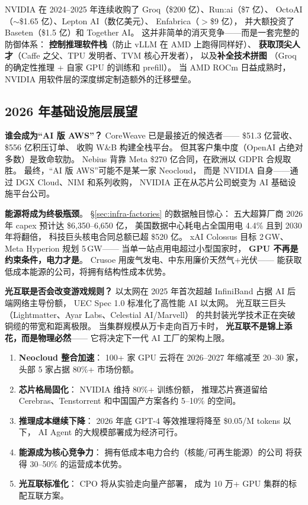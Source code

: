 \begin{keybox}
NVIDIA 在 2024--2025 年连续收购了
Groq（\$200 亿）、Run:ai（\$7 亿）、
OctoAI（$\sim$\$1.65 亿）、Lepton AI（数亿美元）、
Enfabrica（$>$\$9 亿），
并大额投资了 Baseten（\$1.5 亿）和 Together AI。
这并非简单的消灭竞争——而是一套完整的防御体系：
\textbf{控制推理软件栈}（防止 vLLM 在 AMD 上跑得同样好）、
\textbf{获取顶尖人才}（Caffe 之父、TPU 发明者、TVM 核心开发者），
以及\textbf{补全技术拼图}
（Groq 的确定性推理 + 自家 GPU 的训练和 prefill）。
当 AMD ROCm 日益成熟时，
NVIDIA 用软件层的深度绑定制造额外的迁移壁垒。
\end{keybox}

\subsection{2026 年基础设施层展望}

\textbf{谁会成为``AI 版 AWS''？}
CoreWeave 已是最接近的候选者——
\$51.3 亿营收、\$556 亿积压订单、
收购 W\&B 构建全栈平台。
但其客户集中度（OpenAI 占绝对多数）是致命软肋。
Nebius 背靠 Meta \$270 亿合同，在欧洲以 GDPR 合规取胜。
最终，``AI 版 AWS''可能不是某一家 Neocloud，
而是 NVIDIA 自身——通过 DGX Cloud、NIM 和系列收购，
NVIDIA 正在从芯片公司蜕变为 AI 基础设施平台公司。

\textbf{能源将成为终极瓶颈}。
\S\ref{sec:infra-factories} 的数据触目惊心：
五大超算厂商 2026 年 capex 预计达 \$6,350--6,650 亿，
美国数据中心耗电占全国用电 4.4\% 且到 2030 年将翻倍，
科技巨头核电合同总额已超 \$520 亿。
xAI Colossus 目标 2\,GW、Meta Hyperion 规划 5\,GW——
当单一站点用电超过小型国家时，
\textbf{GPU 不再是约束条件，电力才是}。
Crusoe 用废气发电、中东用廉价天然气+光伏——
能获取低成本能源的公司，将拥有结构性成本优势。

\textbf{光互联是否会改变游戏规则？}
以太网在 2025 年首次超越 InfiniBand 占据 AI 后端网络主导份额，
UEC Spec 1.0 标准化了高性能 AI 以太网。
光互联三巨头（Lightmatter、Ayar Labs、Celestial AI/Marvell）
的共封装光学技术正在突破铜缆的带宽和距离极限。
当集群规模从万卡走向百万卡时，
\textbf{光互联不是锦上添花，而是物理必然}——
它将决定下一代 AI 工厂的架构上限。

\begin{corebox}
\begin{enumerate}[noitemsep]
  \item \textbf{Neocloud 整合加速}：
        100+ 家 GPU 云将在 2026--2027 年缩减至 20--30 家，
        头部 5 家占据 80\%+ 市场份额。
  \item \textbf{芯片格局固化}：
        NVIDIA 维持 80\%+ 训练份额，
        推理芯片赛道留给 Cerebras、Tenstorrent
        和中国国产方案各约 5--10\% 的空间。
  \item \textbf{推理成本继续下降}：
        2026 年底 GPT-4 等效推理将降至 \$0.05/M tokens 以下，
        AI Agent 的大规模部署成为经济可行。
  \item \textbf{能源成为核心竞争力}：
        拥有低成本电力合约（核能/可再生能源）的公司
        将获得 30--50\% 的运营成本优势。
  \item \textbf{光互联标准化}：
        CPO 将从实验走向量产部署，
        成为 10 万+ GPU 集群的标配互联方案。
\end{enumerate}
\end{corebox}

